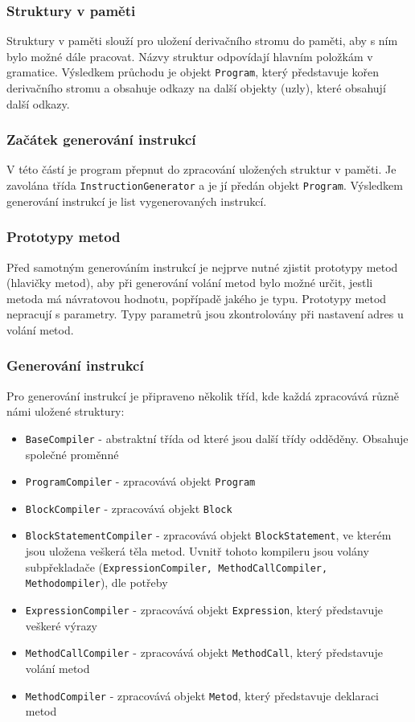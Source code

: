 \documentclass[12pt, a4paper]{article}
\begin{document}
\subsubsection{Struktury v paměti}
\noindent Struktury v paměti slouží pro uložení derivačního stromu do paměti, aby s ním bylo možné dále pracovat. Názvy struktur odpovídají hlavním položkám v gramatice. Výsledkem průchodu je objekt \texttt{Program}, který představuje kořen derivačního stromu a obsahuje odkazy na další objekty (uzly), které obsahují další odkazy.

\subsubsection{Začátek generování instrukcí}
\noindent V této částí je program přepnut do zpracování uložených struktur v paměti. Je zavolána třída \texttt{InstructionGenerator} a je jí předán objekt \texttt{Program}. Výsledkem generování instrukcí je list vygenerovaných instrukcí.

\subsubsection{Prototypy metod}
\noindent Před samotným generováním instrukcí je nejprve nutné zjistit prototypy metod (hlavičky metod), aby při generování volání metod bylo možné určit, jestli metoda má návratovou hodnotu, popřípadě jakého je typu. Prototypy metod nepracují s parametry. Typy parametrů jsou zkontrolovány při nastavení adres u volání metod.

\subsubsection{Generování instrukcí}
\noindent Pro generování instrukcí je připraveno několik tříd, kde každá zpracovává různě námi uložené struktury:
\begin{itemize}
	\item \texttt{BaseCompiler} - abstraktní třída od které jsou další třídy odděděny. Obsahuje společné proměnné
	\item \texttt{ProgramCompiler} - zpracovává objekt \texttt{Program}
	\item \texttt{BlockCompiler} - zpracovává objekt \texttt{Block}
	\item \texttt{BlockStatementCompiler} - zpracovává objekt \texttt{BlockStatement}, ve kterém jsou uložena veškerá těla metod. Uvnitř tohoto kompileru jsou volány subpřekladače (\texttt{ExpressionCompiler, MethodCallCompiler, \newline Methodompiler}), dle potřeby
	\item \texttt{ExpressionCompiler} - zpracovává objekt \texttt{Expression}, který představuje veškeré výrazy
	\item \texttt{MethodCallCompiler} - zpracovává objekt \texttt{MethodCall}, který představuje volání metod
	\item \texttt{MethodCompiler} - zpracovává objekt \texttt{Metod}, který představuje deklaraci metod
\end{itemize}
\end{document}
